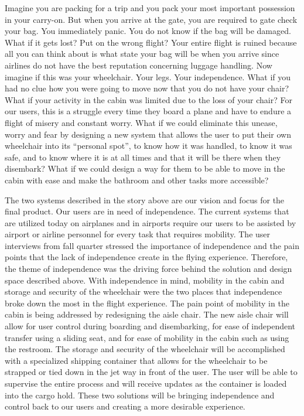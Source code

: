 Imagine you are packing for a trip and you pack your most important possession in your carry-on.   But when you arrive at the gate, you are required to gate check your bag.  You immediately panic. You do not know if the bag will be damaged. What if it gets lost? Put on the wrong flight? Your entire flight is ruined because all you can think about is what state your bag will be when you arrive since airlines do not have the best reputation concerning luggage handling.  Now imagine if this was your wheelchair.  Your legs. Your independence. What if you had no clue how you were going to move now that you do not have your chair? What if your activity in the cabin was limited due to the loss of your chair?   For our users, this is a struggle every time they board a plane and have to endure a flight of misery and constant worry.  What if we could eliminate this unease, worry and fear by designing a new system that allows the user to put their own wheelchair into its “personal spot”, to know how it was handled, to know it was safe, and to know where it is at all times and that it will be there when they disembark?  What if we could design a way for them to be able to move in the cabin with ease and make the bathroom and other tasks more accessible? 

The two systems described in the story above are our vision and focus for the final product. Our users are in need of independence.  The current systems that are utilized today on airplanes and in airports require our users to be assisted by airport or airline personnel for every task that requires mobility.  The user interviews from fall quarter stressed the importance of independence and the pain points that the lack of independence create in the flying experience.  Therefore, the theme of independence was the driving force behind the solution and design space described above.  With independence in mind, mobility in the cabin and storage and security of the wheelchair were the two places that independence broke down the most in the flight experience. The pain point of mobility in the cabin is being addressed by redesigning the aisle chair.  The new aisle chair will allow for user control during boarding and disembarking, for ease of independent transfer using a sliding seat, and for ease of mobility in the cabin such as using the restroom. The storage and security of the wheelchair will be accomplished with a specialized shipping container that allows for the wheelchair to be strapped or tied down in the jet way in front of the user. The user will be able to supervise the entire process and will receive updates as the container is loaded into the cargo hold.  These two solutions will be bringing independence and control back to our users and creating a more desirable experience. 

